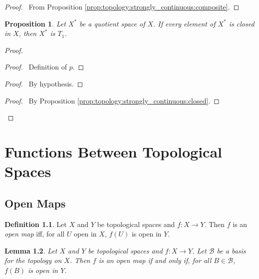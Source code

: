 \documentclass{report}
\let\qed\relax
\newtheorem{lm}{Lemma}[section]
\newtheorem{prop}[lm]{Proposition}
\theoremstyle{definition}
\newtheorem{df}[lm]{Definition}
\begin{document}
  \begin{proof}
    \pf\ From Proposition \ref{prop:topology:strongly_continuous:composite}.
    \qed
  \end{proof}

  \begin{prop}
    Let $X^*$ be a quotient space of $X$. If every element of $X^*$ is closed
    in
    $X$, then $X^*$ is $T_1$.
  \end{prop}

  \begin{proof}
    \pf
    \begin{proof}
      \pf\ Definition of $p$.
    \end{proof}
    \begin{proof}
      \pf\ By hypothesis.
    \end{proof}
    \begin{proof}
      \pf\ By Proposition \ref{prop:topology:strongly_continuous:closed}.
    \end{proof}
    \qed
  \end{proof}

  \chapter{Functions Between Topological Spaces}

  \section{Open Maps}

  \begin{df}
    Let $X$ and $Y$ be topological spaces and $f : X \rightarrow Y$. Then $f$
    is
    an \emph{open map} iff, for all $U$ open in $X$, $f(U)$ is open in $Y$.
  \end{df}

  \begin{lm}
    \label{lm:topology:open_map:basis}
    Let $X$ and $Y$ be topological spaces and $f : X \rightarrow Y$. Let
    $\mathcal{B}$ be a basis for the topology on $X$. Then $f$ is an open map
    if
    and only if, for all $B \in \mathcal{B}$, $f(B)$ is open in $Y$.
  \end{lm}
\end{document}
